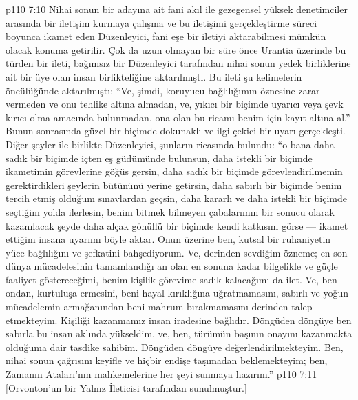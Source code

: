 \vs p110 7:10 Nihai sonun bir adayına ait fani akıl ile gezegensel yüksek denetimciler arasında bir iletişim kurmaya çalışma ve bu iletişimi gerçekleştirme süreci boyunca ikamet eden Düzenleyici, fani eşe bir iletiyi aktarabilmesi mümkün olacak konuma getirilir. Çok da uzun olmayan bir süre önce Urantia üzerinde bu türden bir ileti, bağımsız bir Düzenleyici tarafından nihai sonun yedek birliklerine ait bir üye olan insan birlikteliğine aktarılmıştı. Bu ileti şu kelimelerin öncülüğünde aktarılmıştı: “Ve, şimdi, koruyucu bağlılığımın öznesine zarar vermeden ve onu tehlike altına almadan, ve, yıkıcı bir biçimde uyarıcı veya şevk kırıcı olma amacında bulunmadan, ona olan bu ricamı benim için kayıt altına al.” Bunun sonrasında güzel bir biçimde dokunaklı ve ilgi çekici bir uyarı gerçekleşti. Diğer şeyler ile birlikte Düzenleyici, şunların ricasında bulundu: “o bana daha sadık bir biçimde içten eş güdümünde bulunsun, daha istekli bir biçimde ikametimin görevlerine göğüs gersin, daha sadık bir biçimde görevlendirilmemin gerektirdikleri şeylerin bütününü yerine getirsin, daha sabırlı bir biçimde benim tercih etmiş olduğum sınavlardan geçsin, daha kararlı ve daha istekli bir biçimde seçtiğim yolda ilerlesin, benim bitmek bilmeyen çabalarımın bir sonucu olarak kazanılacak şeyde daha alçak gönüllü bir biçimde kendi katkısını görse --- ikamet ettiğim insana uyarımı böyle aktar. Onun üzerine ben, kutsal bir ruhaniyetin yüce bağlılığını ve şefkatini bahşediyorum. Ve, derinden sevdiğim özneme; en son dünya mücadelesinin tamamlandığı an olan en sonuna kadar bilgelikle ve güçle faaliyet göstereceğimi, benim kişilik görevime sadık kalacağımı da ilet. Ve, ben ondan, kurtuluşa ermesini, beni hayal kırıklığına uğratmamasını, sabırlı ve yoğun mücadelemin armağanından beni mahrum bırakmamasını derinden talep etmekteyim. Kişiliği kazanmamız insan iradesine bağlıdır. Döngüden döngüye ben sabırla bu insan aklında yükseldim, ve, ben, türümün başının onayını kazanmakta olduğuma dair tasdike sahibim. Döngüden döngüye değerlendirilmekteyim. Ben, nihai sonun çağrısını keyifle ve hiçbir endişe taşımadan beklemekteyim; ben, Zamanın Ataları’nın mahkemelerine her şeyi sunmaya hazırım.”
\vs p110 7:11 [Orvonton’un bir Yalnız İleticisi tarafından sunulmuştur.]
